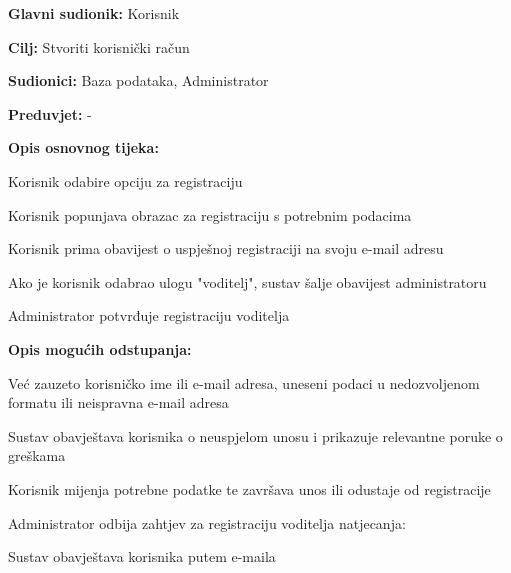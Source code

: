					
					\noindent {}
					\begin{packed_item}
						
						\item \textbf{Glavni sudionik: }Korisnik
						\item  \textbf{Cilj:} Stvoriti korisnički račun
						\item  \textbf{Sudionici:} Baza podataka, Administrator 
						\item  \textbf{Preduvjet:} -
						\item  \textbf{Opis osnovnog tijeka:}
						
						\item[] \begin{packed_enum}
							
							\item Korisnik odabire opciju za registraciju 
							\item Korisnik popunjava obrazac za registraciju s potrebnim podacima 
							\item Korisnik prima obavijest o uspješnoj registraciji na svoju e-mail adresu 
							\item Ako je korisnik odabrao ulogu "voditelj", sustav šalje obavijest administratoru 
							\item Administrator potvrđuje registraciju voditelja 
						\end{packed_enum}
						
						\item  \textbf{Opis mogućih odstupanja:}
						\item[] \begin{packed_item}
							
							\item[2.a] Već zauzeto korisničko ime ili e-mail adresa, uneseni podaci u nedozvoljenom formatu ili neispravna e-mail adresa 
							\item[] \begin{packed_enum}
								
								\item Sustav obavještava korisnika o neuspjelom unosu i prikazuje relevantne poruke o greškama 
								\item Korisnik mijenja potrebne podatke te završava unos ili odustaje od registracije 
								
							\end{packed_enum}
							
							\item[5.a] Administrator odbija zahtjev za registraciju voditelja natjecanja:
							\item[] \begin{packed_enum}
								
								\item Sustav obavještava korisnika putem e-maila
								
							\end{packed_enum}
						\end{packed_item}
					\end{packed_item}
					
